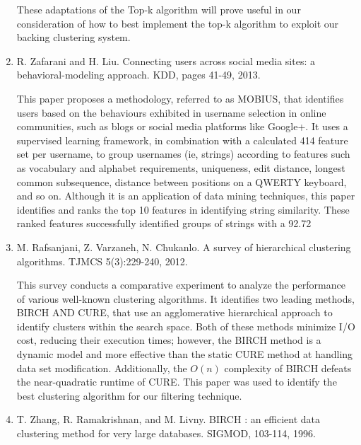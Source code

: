 \documentclass[pdftex,12pt,letter]{article}
\begin{document}
\begin{enumerate}
	These adaptations of the Top-k algorithm will prove useful in our consideration of how to best implement the top-k algorithm to exploit our backing clustering system. 

\item R. Zafarani and H. Liu. Connecting users across social media sites: a behavioral-modeling approach. KDD, pages 41-49, 2013.

This paper proposes a methodology, referred to as MOBIUS, that identifies users based on the behaviours exhibited in username selection in online communities, such as blogs or social media platforms like Google+. It uses a supervised learning framework, in combination with a calculated 414 feature set per username, to group usernames (ie, strings) according to features such as vocabulary and alphabet requirements, uniqueness, edit distance, longest common subsequence, distance between positions on a QWERTY keyboard, and so on. Although it is an application of data mining techniques, this paper identifies and ranks the top 10 features in identifying string similarity. These ranked features successfully identified groups of strings with a 92.72%

\item M. Rafsanjani, Z. Varzaneh, N. Chukanlo. A survey of hierarchical clustering algorithms. TJMCS 5(3):229-240, 2012.

This survey conducts a comparative experiment to analyze the performance of various well-known clustering algorithms. It identifies two leading methods, BIRCH AND CURE, that use an agglomerative hierarchical approach to identify clusters within the search space. Both of these methods minimize I/O cost, reducing their execution times; however, the BIRCH method is a dynamic model and more effective than the static CURE method at handling data set modification. Additionally, the $O(n)$ complexity of BIRCH defeats the near-quadratic runtime of CURE. This paper was used to identify the best clustering algorithm for our filtering technique.

\item T. Zhang, R. Ramakrishnan, and M. Livny. BIRCH : an efficient data clustering method for very large databases. SIGMOD, 103-114, 1996.


\end{enumerate}
\end{document}
